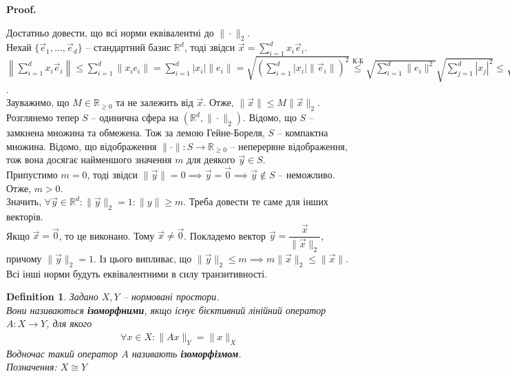 \documentclass[a4paper, 10pt]{article}
\makeatletter
\theoremstyle{theoremdd}
\theoremstyle{theoremdd}
\newtheorem{definition}[theorem]{Definition}
\theoremstyle{theoremdd}
\theoremstyle{theoremdd}
\theoremstyle{theoremdd}
\theoremstyle{theoremdd}
\theoremstyle{theoremdd}
\theoremstyle{theoremdd}
\renewenvironment{proof}[1][Proof.\\]{\par
\pushQED{\hfill \qed}%
\normalfont \topsep6\p@\@plus6\p@\relax
\trivlist
\item\relax
{\bfseries
#1\@addpunct{.}}\hspace\labelsep\ignorespaces
}{%
\popQED\endtrivlist\@endpefalse
}
\makeatother
\begin{document}
\begin{proof}
Достатньо довести, що всі норми еквівалентні до $\| \cdot \|_2$.\\
Нехай $\{\vec{e}_1,\dots,\vec{e}_d\}$ -- стандартний базис $\mathbb{R}^d$, тоді звідси $\vec{x} = \displaystyle\sum_{i=1}^d x_i \vec{e}_i$.\\
$\displaystyle\left\| \sum_{i=1}^d x_i \vec{e}_i
 \right\| \leq \sum_{i=1}^d \| x_i e_i \| = \sum_{i=1}^d |x_i| \|e_i\| = \sqrt{\left( \sum_{i=1}^d |x_i| \|\vec{e}_i\| \right)^2} \overset{\text{К-Б}}{\leq} \sqrt{\sum_{i=1}^d \|e_i\|^2} \sqrt{\sum_{j=1}^d |x_j|^2} \leq \sqrt{\sum_{i=1}^d \|e_i\|^2} \sqrt{\sum_{j=1}^\infty |x_j|^2} = \sqrt{\sum_{i=1}^d \|e_i\|^2} \|\vec{x}\|_2 = M \|\vec{x}\|_2$.\\
Зауважимо, що $M \in \mathbb{R}_{\geq 0}$ та не залежить від $\vec{x}$. Отже, $\|\vec{x}\| \leq M \|\vec{x}\|_2$.
\bigskip \\
Розглянемо тепер $S$ -- одинична сфера на $(\mathbb{R}^d, \|\cdot \|_2)$. Відомо, що $S$ -- замкнена множина та обмежена. Тож за лемою Гейне-Бореля, $S$ -- компактна множина. Відомо, що відображення $\| \cdot \| \colon S \to \mathbb{R}_{\geq 0}$ -- неперервне відображення, тож вона досягає найменшого значення $m$ для деякого $\vec{y} \in S$.\\
Припустимо $m = 0$, тоді звідси $\|\vec{y}\| = 0 \implies \vec{y} = \vec{0} \implies \vec{y} \notin S$ -- неможливо. Отже, $m > 0$.\\
Значить, $\forall \vec{y} \in \mathbb{R}^d: \|\vec{y}\|_2 = 1: \|y\| \geq m$. Треба довести те саме для інших векторів.\\
Якщо $\vec{x} = \vec{0}$, то це виконано. Тому $\vec{x} \neq \vec{0}$. Покладемо вектор $\vec{y} = \dfrac{\vec{x}}{\| \vec{x} \|_2}$, причому $\|\vec{y}\|_2 = 1$. Із цього випливає, що $\| \vec{y} \|_2 \leq m \implies m \|\vec{x}\|_2 \leq \|\vec{x}\|$.
\bigskip \\
Всі інші норми будуть еквівалентними в силу транзитивності.
\end{proof}

\begin{definition}
Задано $X,Y$ -- нормовані простори.\\
Вони називаються \textbf{ізоморфними}, якщо існує бієктивний лінійний оператор $A \colon X \to Y$, для якого
\begin{align*}
\forall x \in X: \|Ax\|_Y = \|x\|_X
\end{align*}
Водночас такий оператор $A$ називають \textbf{ізоморфізмом}.\\
Позначення: $X \cong Y$
\end{definition}
\end{document}

